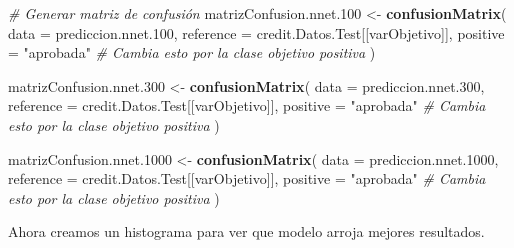 \documentclass[
]{article}
\newenvironment{Shaded}{\begin{snugshade}}{\end{snugshade}}
\newcommand{\AttributeTok}[1]{\textcolor[rgb]{0.13,0.29,0.53}{#1}}
\newcommand{\CommentTok}[1]{\textcolor[rgb]{0.56,0.35,0.01}{\textit{#1}}}
\newcommand{\FloatTok}[1]{\textcolor[rgb]{0.00,0.00,0.81}{#1}}
\newcommand{\FunctionTok}[1]{\textcolor[rgb]{0.13,0.29,0.53}{\textbf{#1}}}
\newcommand{\NormalTok}[1]{#1}
\newcommand{\OtherTok}[1]{\textcolor[rgb]{0.56,0.35,0.01}{#1}}
\newcommand{\StringTok}[1]{\textcolor[rgb]{0.31,0.60,0.02}{#1}}
\begin{document}
\begin{Shaded}
\begin{Highlighting}[]
\CommentTok{\# Generar matriz de confusión}
\NormalTok{matrizConfusion.nnet}\FloatTok{.100} \OtherTok{\textless{}{-}} \FunctionTok{confusionMatrix}\NormalTok{(}
  \AttributeTok{data =}\NormalTok{ prediccion.nnet}\FloatTok{.100}\NormalTok{,}
  \AttributeTok{reference =}\NormalTok{ credit.Datos.Test[[varObjetivo]],}
  \AttributeTok{positive =} \StringTok{"aprobada"} \CommentTok{\# Cambia esto por la clase objetivo positiva}
\NormalTok{)}

\NormalTok{matrizConfusion.nnet}\FloatTok{.300} \OtherTok{\textless{}{-}} \FunctionTok{confusionMatrix}\NormalTok{(}
  \AttributeTok{data =}\NormalTok{ prediccion.nnet}\FloatTok{.300}\NormalTok{,}
  \AttributeTok{reference =}\NormalTok{ credit.Datos.Test[[varObjetivo]],}
  \AttributeTok{positive =} \StringTok{"aprobada"} \CommentTok{\# Cambia esto por la clase objetivo positiva}
\NormalTok{)}

\NormalTok{matrizConfusion.nnet}\FloatTok{.1000} \OtherTok{\textless{}{-}} \FunctionTok{confusionMatrix}\NormalTok{(}
  \AttributeTok{data =}\NormalTok{ prediccion.nnet}\FloatTok{.1000}\NormalTok{,}
  \AttributeTok{reference =}\NormalTok{ credit.Datos.Test[[varObjetivo]],}
  \AttributeTok{positive =} \StringTok{"aprobada"} \CommentTok{\# Cambia esto por la clase objetivo positiva}
\NormalTok{)}
\end{Highlighting}
\end{Shaded}

Ahora creamos un histograma para ver que modelo arroja mejores
resultados.
\end{document}
